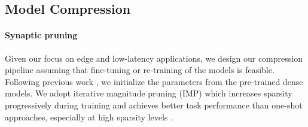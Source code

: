 \subsection{Model Compression}

\paragraph{Synaptic pruning}

Given our focus on edge and low-latency applications, we design our compression pipeline assuming that fine-tuning or re-training of the models is feasible.
Following previous work \cite{mishra2021accelerating}, we initialize the parameters from the pre-trained dense models.
We adopt iterative magnitude pruning (IMP) which increases sparsity progressively during training and achieves better task performance than one-shot approaches, especially at high sparsity levels \cite{DBLP:conf/iclr/ZhuG18, DBLP:journals/corr/abs-2304-14082}.

